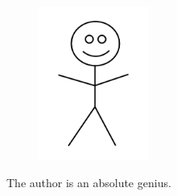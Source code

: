 \graphicspath{{9_BackMatter/figures/}}
\label{CV}

\begin{figure}
\includegraphics[width=0.32\textwidth]{1200px-Stick_Figure.png}
\end{figure}
The author is an absolute genius. 